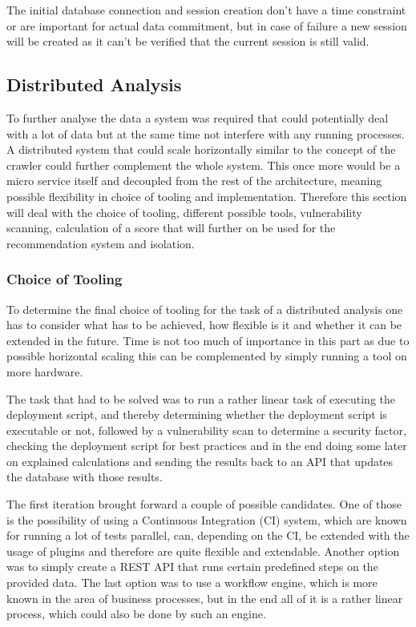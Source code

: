 The initial database connection and session creation don't have a time constraint or are important for actual data commitment, but in case of failure a new session will be created as it can't be verified that the current session is still valid.

\subsection{Distributed Analysis}
To further analyse the data a system was required that could potentially deal with a lot of data but at the same time not interfere with any running processes. A distributed system that could scale horizontally similar to the concept of the crawler could further complement the whole system. This once more would be a micro service itself and decoupled from the rest of the architecture, meaning possible flexibility in choice of tooling and implementation. Therefore this section will deal with the choice of tooling, different possible tools, vulnerability scanning, calculation of a score that will further on be used for the recommendation system and isolation.

\subsubsection{Choice of Tooling}
To determine the final choice of tooling for the task of a distributed analysis one has to consider what has to be achieved, how flexible is it and whether it can be extended in the future. Time is not too much of importance in this part as due to possible horizontal scaling this can be complemented by simply running a tool on more hardware.

The task that had to be solved was to run a rather linear task of executing the deployment script, and thereby determining whether the deployment script is executable or not, followed by a vulnerability scan to determine a security factor, checking the deployment script for best practices and in the end doing some later on explained calculations and sending the results back to an API that updates the database with those results.

The first iteration brought forward a couple of possible candidates. One of those is the possibility of using a Continuous Integration (CI) system, which are known for running a lot of tests parallel, can, depending on the CI, be extended with the usage of plugins and therefore are quite flexible and extendable. Another option was to simply create a REST API that runs certain predefined steps on the provided data. The last option was to use a workflow engine, which is more known in the area of business processes, but in the end all of it is a rather linear process, which could also be done by such an engine.

